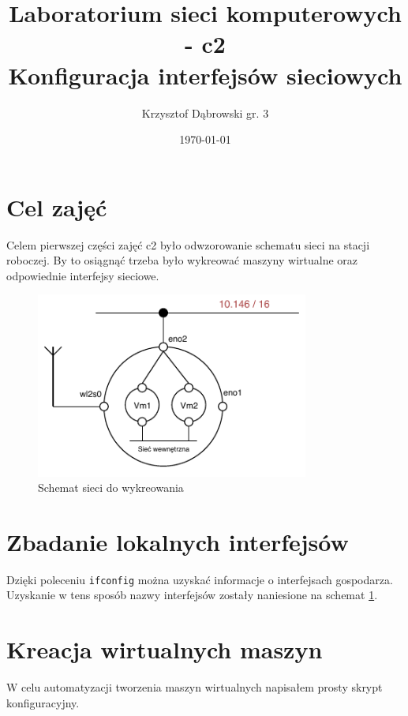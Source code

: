 \documentclass{article}
\title{Laboratorium sieci komputerowych - c2 \\ Konfiguracja interfejsów sieciowych}
\author{Krzysztof Dąbrowski gr. 3}
\date{\today}
\begin{document}
\maketitle{}
\tableofcontents{}

\section{Cel zajęć}
Celem pierwszej części zajęć c2 było odwzorowanie schematu sieci na stacji roboczej. By to osiągnąć trzeba było wykreować maszyny wirtualne oraz odpowiednie interfejsy sieciowe.

\begin{figure}[h]
    \includegraphics[width=0.80\textwidth]{schemat}
    \centering
    \caption{Schemat sieci do wykreowania}
    \label{fig:schemat}
\end{figure}

\section{Zbadanie lokalnych interfejsów}
Dzięki poleceniu \texttt{ifconfig} można uzyskać informacje o interfejsach gospodarza. Uzyskanie w tens sposób nazwy interfejsów zostały naniesione na schemat \ref{fig:schemat}.

\section{Kreacja wirtualnych maszyn}
W celu automatyzacji tworzenia maszyn wirtualnych napisałem prosty skrypt konfiguracyjny.
\end{document}
